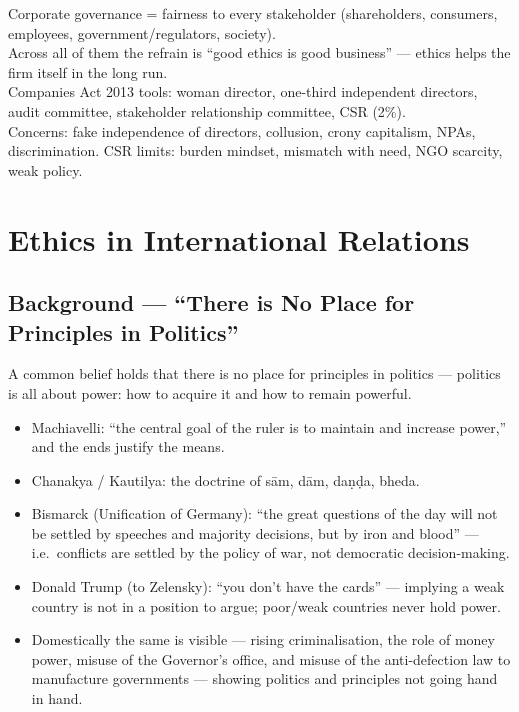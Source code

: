 \begin{QuickRevision}
Corporate governance = fairness to every stakeholder (shareholders, consumers, employees, government/regulators, society).\\
Across all of them the refrain is ``good ethics is good business'' --- ethics helps the firm itself in the long run.\\
Companies Act 2013 tools: woman director, one-third independent directors, audit committee, stakeholder relationship committee, CSR (2\%).\\
Concerns: fake independence of directors, collusion, crony capitalism, NPAs, discrimination. CSR limits: burden mindset, mismatch with need, NGO scarcity, weak policy.
\end{QuickRevision}

\section{Ethics in International Relations}

\subsection{Background --- ``There is No Place for Principles in Politics''}
\begin{KeyConcept}
A common belief holds that there is no place for principles in politics --- politics is all about power: how to acquire it and how to remain powerful.
\end{KeyConcept}

\begin{ExampleBox}
\begin{itemize}
\item Machiavelli: ``the central goal of the ruler is to maintain and increase power,'' and the ends justify the means.
\item Chanakya / Kautilya: the doctrine of s\={a}m, d\={a}m, da\d{n}\d{d}a, bheda.
\item Bismarck (Unification of Germany): ``the great questions of the day will not be settled by speeches and majority decisions, but by iron and blood'' --- i.e.\ conflicts are settled by the policy of war, not democratic decision-making.
\item Donald Trump (to Zelensky): ``you don't have the cards'' --- implying a weak country is not in a position to argue; poor/weak countries never hold power.
\item Domestically the same is visible --- rising criminalisation, the role of money power, misuse of the Governor's office, and misuse of the anti-defection law to manufacture governments --- showing politics and principles not going hand in hand.
\end{itemize}
\end{ExampleBox}

